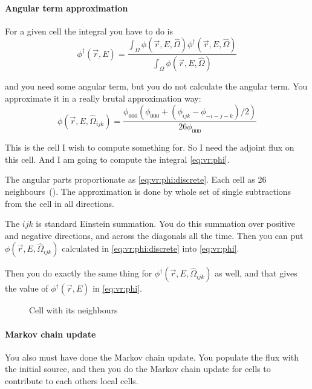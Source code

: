 \begin{description}
\paragraph{Angular term approximation}

For a given cell the integral you have to do is 
\begin{equation}
\label{eq:vr:phi}
  \phi^\dag(\vec{r},E) = \frac{\int_\Omega \phi(\vec{r},E,\hat{\Omega})
    \phi^\dag(\vec{r},E,\hat{\Omega}) }
  {\int_\Omega \phi(\vec{r},E,\hat{\Omega}) }
\end{equation}

and you need some angular term, but you do not calculate the angular term. You approximate it in a really brutal approximation way:
\begin{equation}
  \label{eq:vr:phi:discrete}
  \phi(\vec{r},E,\hat\Omega_{ijk})=
  \frac{\phi_{000} (\phi_{000}+(\phi_{ijk} - \phi_{-i-j-k})/2) }
  { 26 \phi_{000} }
\end{equation}

This is the cell I wish to compute something for. So I need the adjoint flux on this cell.
And I am going to compute the integral \eqref{eq:vr:phi}.

The angular parts proportionate as \eqref{eq:vr:phi:discrete}.
Each cell as 26 neighbours~(). The approximation is done by whole set of single subtractions from the cell in all directions.

The $ijk$ is standard Einstein summation. You do this summation over positive and negative directions, and across the diagonals all the time.
Then you can put $\phi(\vec{r},E,\hat\Omega_{ijk})$ calculated in \eqref{eq:vr:phi:discrete} into \eqref{eq:vr:phi}.

Then you do exactly the same thing for $\phi^\dag(\vec{r},E,\hat\Omega_{ijk})$ as well, and that gives the value of 
$\phi^\dag(\vec{r},E)$ in \eqref{eq:vr:phi}.


\begin{figure}
  \centering
  
  \caption{Cell with its neighbours}
  \label{fig:vr:cell}
\end{figure}

\paragraph{Markov chain update}
You also must have done the Markov chain update. You populate the flux with the initial source, and then you do the Markov chain update for cells to contribute to each others local cells.


\end{description}
